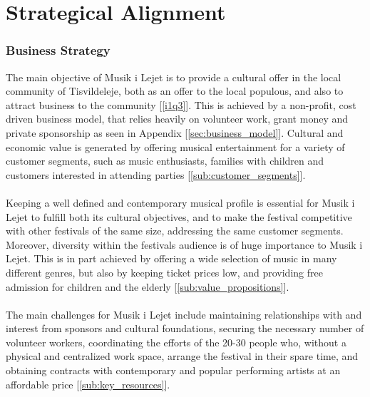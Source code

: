 \part{Strategical Alignment}

\section{Business Strategy}
The main objective of Musik i Lejet is to provide a cultural offer in the local community of Tisvildeleje, both as an offer to the local populous, and also to attract business to the community [\ref{i1q3}]. This is achieved by a non-profit, cost driven business model, that relies heavily on volunteer work, grant money and private sponsorship as seen in Appendix [\ref{sec:business_model}]. Cultural and economic value is generated by offering musical entertainment for a variety of customer segments, such as music enthusiasts, families with children and customers interested in attending parties [\ref{sub:customer_segments}].
\\ \\
Keeping a well defined and contemporary musical profile is essential for Musik i Lejet to fulfill both its cultural objectives, and to make the festival competitive with other festivals of the same size, addressing the same customer segments. Moreover, diversity within the festivals audience is of huge importance to Musik i Lejet. This is in part achieved by offering a wide selection of music in many different genres, but also by keeping ticket prices low, and providing free admission for children and the elderly [\ref{sub:value_propositions}].
\\ \\
The main challenges for Musik i Lejet include maintaining relationships with and interest from sponsors and cultural foundations, securing the necessary number of volunteer workers, coordinating the efforts of the 20-30 people who, without a physical and centralized work space, arrange the festival in their spare time, and obtaining contracts with contemporary and popular performing artists at an affordable price [\ref{sub:key_resources}].

